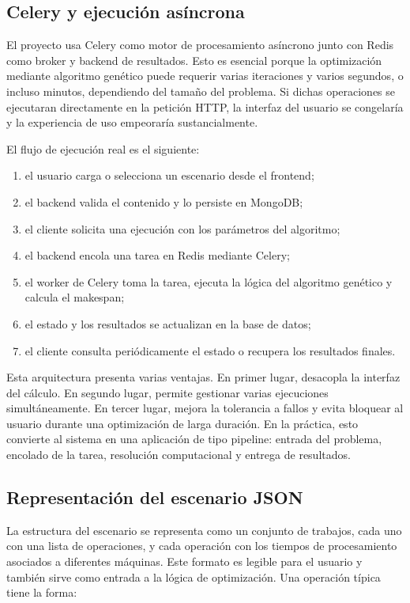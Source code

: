\documentclass[11pt,a4paper]{article}
\begin{document}
\subsection{Celery y ejecución asíncrona}

El proyecto usa Celery como motor de procesamiento asíncrono junto con Redis como broker y backend de resultados. Esto es esencial porque la optimización mediante algoritmo genético puede requerir varias iteraciones y varios segundos, o incluso minutos, dependiendo del tamaño del problema. Si dichas operaciones se ejecutaran directamente en la petición HTTP, la interfaz del usuario se congelaría y la experiencia de uso empeoraría sustancialmente.

El flujo de ejecución real es el siguiente:

\begin{enumerate}
    \item el usuario carga o selecciona un escenario desde el frontend;
    \item el backend valida el contenido y lo persiste en MongoDB;
    \item el cliente solicita una ejecución con los parámetros del algoritmo;
    \item el backend encola una tarea en Redis mediante Celery;
    \item el worker de Celery toma la tarea, ejecuta la lógica del algoritmo genético y calcula el makespan;
    \item el estado y los resultados se actualizan en la base de datos;
    \item el cliente consulta periódicamente el estado o recupera los resultados finales.
\end{enumerate}

Esta arquitectura presenta varias ventajas. En primer lugar, desacopla la interfaz del cálculo. En segundo lugar, permite gestionar varias ejecuciones simultáneamente. En tercer lugar, mejora la tolerancia a fallos y evita bloquear al usuario durante una optimización de larga duración. En la práctica, esto convierte al sistema en una aplicación de tipo pipeline: entrada del problema, encolado de la tarea, resolución computacional y entrega de resultados.

\subsection{Representación del escenario JSON}

La estructura del escenario se representa como un conjunto de trabajos, cada uno con una lista de operaciones, y cada operación con los tiempos de procesamiento asociados a diferentes máquinas. Este formato es legible para el usuario y también sirve como entrada a la lógica de optimización. Una operación típica tiene la forma:
\end{document}
